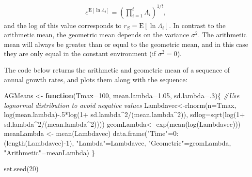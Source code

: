 \documentclass[
]{book}
\newenvironment{Shaded}{\begin{snugshade}}{\end{snugshade}}
\newcommand{\AttributeTok}[1]{\textcolor[rgb]{0.77,0.63,0.00}{#1}}
\newcommand{\CommentTok}[1]{\textcolor[rgb]{0.56,0.35,0.01}{\textit{#1}}}
\newcommand{\ControlFlowTok}[1]{\textcolor[rgb]{0.13,0.29,0.53}{\textbf{#1}}}
\newcommand{\DecValTok}[1]{\textcolor[rgb]{0.00,0.00,0.81}{#1}}
\newcommand{\FloatTok}[1]{\textcolor[rgb]{0.00,0.00,0.81}{#1}}
\newcommand{\FunctionTok}[1]{\textcolor[rgb]{0.00,0.00,0.00}{#1}}
\newcommand{\NormalTok}[1]{#1}
\newcommand{\OtherTok}[1]{\textcolor[rgb]{0.56,0.35,0.01}{#1}}
\newcommand{\SpecialCharTok}[1]{\textcolor[rgb]{0.00,0.00,0.00}{#1}}
\newcommand{\StringTok}[1]{\textcolor[rgb]{0.31,0.60,0.02}{#1}}
\begin{document}
\begin{align} 
e^{\text{E}[\ln\Lambda_t]}=\left(\prod_{i=1}^t \Lambda_i \right)^{1/t},
\end{align}
and the log of this value corresponds to \(r_S=\text{E}[\ln\Lambda_t]\). In contrast to the arithmetic mean, the geometric mean depends on the variance \(\sigma^2\). The arithmetic mean will always be greater than or equal to the geometric mean, and in this case they are only equal in the constant environment (if \(\sigma^2=0\)).

The code below returns the arithmetic and geometric mean of a sequence of annual growth rates, and plots them along with the sequence:

\begin{Shaded}
\begin{Highlighting}[]
\NormalTok{AGMeans }\OtherTok{\textless{}{-}} \ControlFlowTok{function}\NormalTok{(}\AttributeTok{Tmax=}\DecValTok{100}\NormalTok{, }\AttributeTok{mean.lambda=}\FloatTok{1.05}\NormalTok{, }\AttributeTok{sd.lambda=}\NormalTok{.}\DecValTok{3}\NormalTok{)\{}
  \CommentTok{\#Use lognormal distribution to avoid negative values}
\NormalTok{  Lambdavec}\OtherTok{\textless{}{-}}\FunctionTok{rlnorm}\NormalTok{(}\AttributeTok{n=}\NormalTok{Tmax, }\FunctionTok{log}\NormalTok{(mean.lambda)}\SpecialCharTok{{-}}\NormalTok{.}\DecValTok{5}\SpecialCharTok{*}\FunctionTok{log}\NormalTok{(}\DecValTok{1}\SpecialCharTok{+}\NormalTok{ sd.lambda}\SpecialCharTok{\^{}}\DecValTok{2}\SpecialCharTok{/}\NormalTok{(mean.lambda}\SpecialCharTok{\^{}}\DecValTok{2}\NormalTok{)), }\AttributeTok{sdlog=}\FunctionTok{sqrt}\NormalTok{(}\FunctionTok{log}\NormalTok{(}\DecValTok{1}\SpecialCharTok{+}\NormalTok{ sd.lambda}\SpecialCharTok{\^{}}\DecValTok{2}\SpecialCharTok{/}\NormalTok{(mean.lambda}\SpecialCharTok{\^{}}\DecValTok{2}\NormalTok{))))}
\NormalTok{   geomLambda}\OtherTok{\textless{}{-}} \FunctionTok{exp}\NormalTok{(}\FunctionTok{mean}\NormalTok{(}\FunctionTok{log}\NormalTok{(Lambdavec)))}
\NormalTok{   meanLambda }\OtherTok{\textless{}{-}} \FunctionTok{mean}\NormalTok{(Lambdavec)}
  \FunctionTok{data.frame}\NormalTok{(}\StringTok{"Time"}\OtherTok{=}\DecValTok{0}\SpecialCharTok{:}\NormalTok{(}\FunctionTok{length}\NormalTok{(Lambdavec)}\SpecialCharTok{{-}}\DecValTok{1}\NormalTok{), }\StringTok{"Lambda"}\OtherTok{=}\NormalTok{Lambdavec, }\StringTok{"Geometric"}\OtherTok{=}\NormalTok{geomLambda, }\StringTok{"Arithmetic"}\OtherTok{=}\NormalTok{meanLambda)}
\NormalTok{\}}

\FunctionTok{set.seed}\NormalTok{(}\DecValTok{20}\NormalTok{) }


\end{Highlighting}
\end{Shaded}
\end{document}
